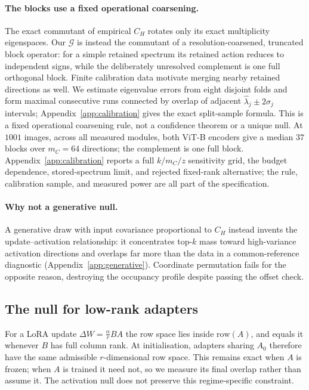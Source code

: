 \paragraph{The blocks use a fixed operational coarsening.}
The exact commutant of empirical $C_H$ rotates only its exact multiplicity eigenspaces. Our
$\mathcal G$ is instead the commutant of a resolution-coarsened, truncated block operator: for a
simple retained spectrum its retained action reduces to independent signs, while the deliberately
unresolved complement is one full orthogonal block. Finite calibration data motivate merging
nearby retained directions as well. We estimate eigenvalue errors from eight disjoint folds and
form maximal consecutive runs connected by overlap of adjacent
$\widehat\lambda_j\mathbin{\pm}2\sigma_j$ intervals; Appendix~\ref{app:calibration} gives the
exact split-sample formula.
This is a fixed operational coarsening rule, not a confidence theorem or a unique null. At $1001$
images, across all measured modules, both ViT-B encoders give a median $37$ blocks over $m_C=64$
directions; the complement is
one full block. Appendix~\ref{app:calibration} reports a full $k/m_C/z$ sensitivity grid, the
budget dependence, stored-spectrum limit, and rejected
fixed-rank alternative; the rule, calibration sample, and measured power are all part of the
specification.

\paragraph{Why not a generative null.}
A generative draw with input covariance proportional to $C_H$ instead invents the update--activation
relationship: it concentrates top-$k$ mass toward high-variance activation directions and
overlaps far more than the data in a common-reference diagnostic
(Appendix~\ref{app:generative}). Coordinate permutation fails for the
opposite reason, destroying the occupancy profile despite passing the offset check.

\subsection{The null for low-rank adapters}
\label{sec:lora-null}

For a LoRA update $\Delta W = \tfrac{\alpha}{r} BA$ \citep{hu2022lora} the row space lies inside
$\mathrm{row}(A)$, and equals it whenever $B$ has full column rank. At initialisation, adapters
sharing $A_0$ therefore have the same admissible $r$-dimensional row space. This remains exact
when $A$ is frozen; when $A$ is trained it need not, so we measure its final overlap rather than
assume it. The activation null does not preserve this regime-specific constraint.


